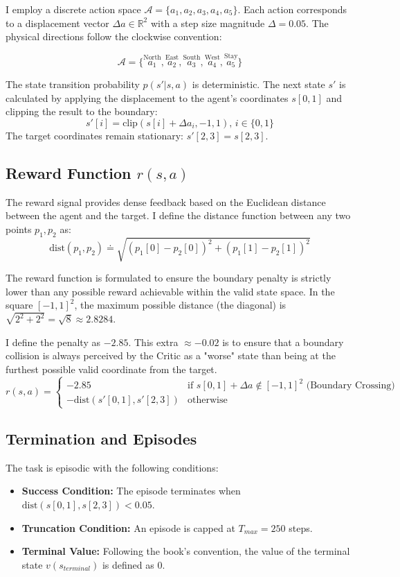 \documentclass[12pt]{article}
\begin{document}
	I employ a discrete action space $\mathcal{A} = \{a_1, a_2, a_3, a_4, a_5\}$. Each action corresponds to a displacement vector $\Delta a \in \mathbb{R}^2$ with a step size magnitude $\Delta = 0.05$. The physical directions follow the clockwise convention:
	
	$$ \mathcal{A} = \{ 
	\overset{\text{North}}{a_1}, 
	\overset{\text{East}}{a_2}, 
	\overset{\text{South}}{a_3}, 
	\overset{\text{West}}{a_4}, 
	\overset{\text{Stay}}{a_5} 
	\} $$
	
	The state transition probability $p(s' | s, a)$ is deterministic. The next state $s'$ is calculated by applying the displacement to the agent's coordinates $s[0, 1]$ and clipping the result to the boundary: 
	$$ s'[i] = \text{clip}(s[i] + \Delta a_i, -1, 1), \, i \in \{0, 1\} $$ 
	The target coordinates remain stationary: $s'[2, 3] = s[2, 3]$.
	
	\subsection{Reward Function $r(s, a)$}
	The reward signal provides dense feedback based on the Euclidean distance between the agent and the target. I define the distance function between any two points $p_1, p_2$ as:
	$$ \text{dist}(p_1, p_2) \doteq \sqrt{ (p_1[0] - p_2[0])^2 + (p_1[1] - p_2[1])^2 } $$
	
	The reward function is formulated to ensure the boundary penalty is strictly lower than any possible reward achievable within the valid state space. In the square $[-1, 1]^2$, the maximum possible distance (the diagonal) is $\sqrt{2^2 + 2^2} = \sqrt{8} \approx 2.8284$. 
	
	I define the penalty as $-2.85$. This extra $\approx -0.02$ is to ensure that a boundary collision is always perceived by the Critic as a "worse" state than being at the furthest possible valid coordinate from the target.
	$$ 
	r(s, a) = 
	\begin{cases} 
		-2.85 & \text{if } s[0,1] + \Delta a \notin [-1, 1]^2 \text{ (Boundary Crossing)} \\
		-\text{dist}(s'[0,1], s'[2,3]) & \text{otherwise}
	\end{cases}
	$$
	
	\subsection{Termination and Episodes}
	The task is episodic with the following conditions:
	\begin{itemize}
		\item \textbf{Success Condition:} The episode terminates when $\text{dist}(s[0,1], s[2,3]) < 0.05$.
		\item \textbf{Truncation Condition:} An episode is capped at $T_{max} = 250$ steps.
		\item \textbf{Terminal Value:} Following the book's convention, the value of the terminal state $v(s_{terminal})$ is defined as $0$.
	\end{itemize}
	
\end{document}
